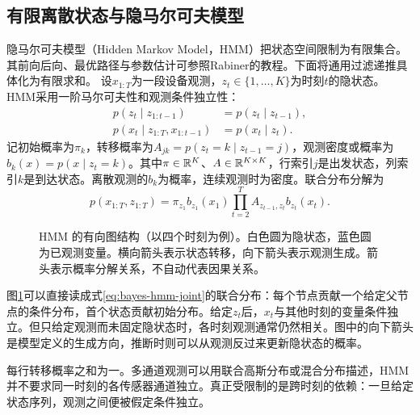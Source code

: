\subsection{有限离散状态与隐马尔可夫模型}
隐马尔可夫模型（Hidden Markov Model，HMM）把状态空间限制为有限集合。其前向后向、最优路径与参数估计可参照Rabiner的教程\cite{rabiner1989hmm}。下面将通用过滤递推具体化为有限求和。
设$x_{1:T}$为一段设备观测，$z_t\in\{1,\ldots,K\}$为时刻$t$的隐状态。HMM采用一阶马尔可夫性和观测条件独立性：
\begin{align}
 p(z_t\mid z_{1:t-1})&=p(z_t\mid z_{t-1}),\\
 p(x_t\mid z_{1:T},x_{1:t-1})&=p(x_t\mid z_t).
\end{align}
记初始概率为$\pi_k$，转移概率为$A_{jk}=p(z_t=k\mid z_{t-1}=j)$，观测密度或概率为$b_k(x)=p(x\mid z_t=k)$。其中$\pi\in\mathbb{R}^K$、$A\in\mathbb{R}^{K\times K}$，行索引$j$是出发状态，列索引$k$是到达状态。离散观测的$b_k$为概率，连续观测时为密度。联合分布分解为
\begin{equation}
 p(x_{1:T},z_{1:T})=\pi_{z_1}b_{z_1}(x_1)
 \prod_{t=2}^{T}A_{z_{t-1},z_t}b_{z_t}(x_t).\label{eq:bayes-hmm-joint}
\end{equation}
\begin{figure}[htbp]
\centering
{}
\caption{HMM 的有向图结构（以四个时刻为例）。白色圆为隐状态，蓝色圆为已观测变量。横向箭头表示状态转移，向下箭头表示观测生成。箭头表示概率分解关系，不自动代表因果关系。}
\label{fig:bayes-hmm-structure}
\end{figure}
图\ref{fig:bayes-hmm-structure}可以直接读成式\eqref{eq:bayes-hmm-joint}的联合分布：每个节点贡献一个给定父节点的条件分布，首个状态贡献初始分布。给定$z_t$后，$x_t$与其他时刻的变量条件独立。但只给定观测而未固定隐状态时，各时刻观测通常仍然相关。图中的向下箭头是模型定义的生成方向，推断时则可以从观测反过来更新隐状态的概率。

每行转移概率之和为一。多通道观测可以用联合高斯分布或混合分布描述，HMM 并不要求同一时刻的各传感器通道独立。真正受限制的是跨时刻的依赖：一旦给定状态序列，观测之间便被假定条件独立。


